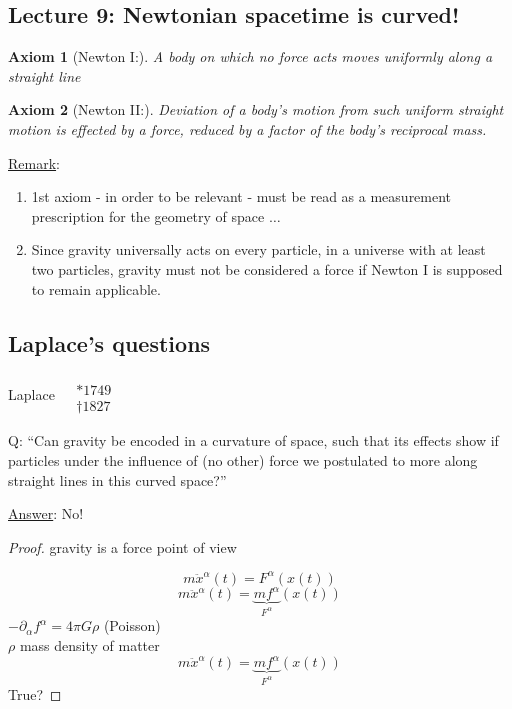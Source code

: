 \documentclass[10pt]{amsart}
\newtheorem{axiom}{Axiom}
\begin{document}
\begin{multicols*}{2}
	
	\section{Lecture 9: Newtonian spacetime is curved!}
	
	\begin{axiom}[Newton I:]
		A body on which \emph{no} force acts moves uniformly along a straight line 
	\end{axiom}
	
	\begin{axiom}[Newton II:]
		Deviation of a body's motion from such uniform straight motion is effected by a force, reduced by a factor of the body's reciprocal mass.  
	\end{axiom}
	
	\underline{Remark}: \begin{enumerate}
		\item[(1)] 1st axiom - in order to be relevant - must be read as a measurement prescription for the geometry of space $\dots $
		\item[(2)] Since gravity universally acts on every particle, in a universe with at least two particles, gravity must not be considered a force if Newton I is supposed to remain applicable.  
	\end{enumerate}
	
	\subsection{Laplace's questions} Laplace $\begin{aligned}  & \quad \\ 
	& * 1749 \\
	& \dag 1827  \end{aligned}$
	
	Q: ``Can gravity be encoded in a curvature of space, such that its effects show if particles under the influence of (no other) force we postulated to more along straight lines in this curved space?''
	
	\underline{Answer}: No!
	
	\begin{proof}
		gravity is a force point of view
		
		
		\[
		m \ddot{x}^{\alpha}(t) = F^{\alpha}(x(t))
		\]
		\[
		m\ddot{x}^{\alpha}(t) = \underbrace{mf^{\alpha}}_{F^{\alpha}}(x(t))
		\]
		$-\partial_{\alpha} f^{\alpha} = 4\pi G\rho$ (Poisson) \\
		$\rho $ mass density of matter
		\[
		m \ddot{x}^{\alpha}(t)= \underbrace{mf^{\alpha}}_{F^{\alpha}}(x(t))
		\]
		True?
		

\end{proof}
\end{multicols*}
\end{document}
